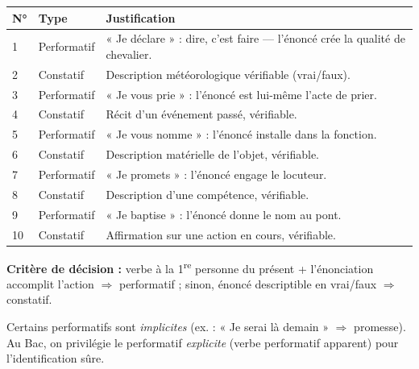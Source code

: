 \documentclass[11pt]{article}
\begin{document}
\begin{corrige}
\begin{center}
\begin{tabularx}{\linewidth}{|l|X|X|}\hline
\rowcolor{popblueL}\textbf{N°} & \textbf{Type} & \textbf{Justification} \\ \hline
1 & Performatif & « Je déclare » : dire, c'est faire — l'énoncé crée la qualité de chevalier. \\ \hline
2 & Constatif & Description météorologique vérifiable (vrai/faux). \\ \hline
3 & Performatif & « Je vous prie » : l'énoncé est lui-même l'acte de prier. \\ \hline
4 & Constatif & Récit d'un événement passé, vérifiable. \\ \hline
5 & Performatif & « Je vous nomme » : l'énoncé installe dans la fonction. \\ \hline
6 & Constatif & Description matérielle de l'objet, vérifiable. \\ \hline
7 & Performatif & « Je promets » : l'énoncé engage le locuteur. \\ \hline
8 & Constatif & Description d'une compétence, vérifiable. \\ \hline
9 & Performatif & « Je baptise » : l'énoncé donne le nom au pont. \\ \hline
10 & Constatif & Affirmation sur une action en cours, vérifiable. \\ \hline
\end{tabularx}
\end{center}
\textbf{Critère de décision :} verbe à la 1\textsuperscript{re} personne du présent + l'énonciation accomplit l'action $\Rightarrow$ performatif ; sinon, énoncé descriptible en vrai/faux $\Rightarrow$ constatif.
\end{corrige}

\begin{attention}
Certains performatifs sont \emph{implicites} (ex. : « Je serai là demain » $\Rightarrow$ promesse). Au Bac, on privilégie le performatif \emph{explicite} (verbe performatif apparent) pour l'identification sûre.
\end{attention}
\end{document}
